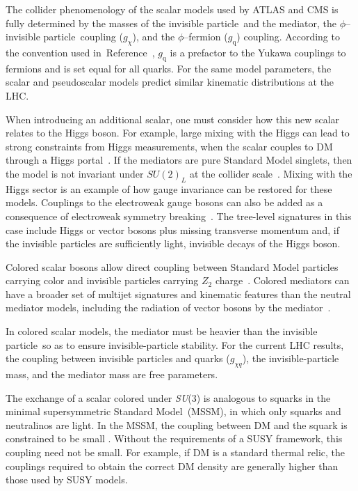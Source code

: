 \documentclass{ar-1col}
\newcommand{\chiDM}{\ensuremath{\chi}\xspace}
\newcommand{\IP}{invisible particle}
\newcommand{\gDM}{\ensuremath{g_{\chiDM}}\xspace}
\newcommand{\gdm}{\gDM}
\newcommand{\gdmq}{\ensuremath{g_{\chiDM q}}\xspace}
\newcommand{\gq}{$g_{\mathrm{q}}$\xspace}
\begin{document}
{The collider phenomenology of the scalar models used by ATLAS and CMS is fully
determined by the masses of the \IP\  and the mediator, the
$\phi$--\IP\  coupling (\gdm), and the $\phi$--fermion (\gq) coupling.
According to the convention used in~Reference~, \gq is a
prefactor to the Yukawa couplings to fermions and is set equal for
all quarks. For the same model parameters, the scalar and
pseudoscalar models predict similar kinematic distributions at the LHC.

When introducing an additional scalar, one must consider how this new
scalar relates to the Higgs boson. For example, large mixing with the Higgs can
lead to strong constraints from Higgs measurements, 
when the scalar couples to DM through a Higgs
portal~\cite{Berlin:2014cfa}. If the mediators are pure Standard Model
singlets, then the model is not invariant under
$SU(2)_L$ at the collider scale~\cite{Bell:2016ekl}. Mixing
with the Higgs sector is an example of how gauge invariance can be restored for these models. 
Couplings to the electroweak
gauge bosons can also be added as a consequence of electroweak
symmetry breaking~\cite{Bauer:2016gys,Englert:2016joy}. The
tree-level signatures in this case include Higgs or vector bosons
plus missing transverse momentum and, if the {\IP}s are
sufficiently light, invisible decays of the Higgs boson.

{Colored scalar bosons} allow direct
coupling between Standard Model particles carrying color and {\IP}s carrying $Z_2$
charge~\cite{Bai:2013iqa,Papucci:2014iwa,An:2013xka,
Bell:2012rg,Ko:2016zxg}.
Colored mediators can have a broader set of
multijet signatures and kinematic features than the neutral
mediator models, including the radiation of vector bosons by the
mediator~\cite{Bell:2012rg}.

In colored scalar models, the mediator must be heavier
than the \IP\ so as  to ensure invisible-particle stability. For the current LHC results,
the coupling between {\IP}s and quarks (\gdmq), the invisible-particle  mass, and
the mediator mass are free parameters.

The exchange of a scalar colored under \textit{SU}(3) is analogous to
squarks in the minimal supersymmetric Standard Model\ (MSSM), in which only squarks and neutralinos are light.
In the MSSM, the coupling between DM and the squark is constrained
to be small \cite{Abercrombie:2015wmb}. Without the requirements
of a SUSY framework, this coupling need not be small. For example,
if DM is a standard thermal relic, the couplings required to
obtain the correct DM density are generally higher than
those used by SUSY models. 

}
\end{document}
